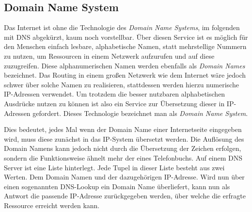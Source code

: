 \hypertarget{domain-name-system}{%
\subsection{Domain Name System}\label{domain-name-system}}

Das Internet ist ohne die Technologie des \emph{Domain Name Systems}, im
folgenden mit DNS abgekürzt, kaum noch vorstellbar. Über diesen Service
ist es möglich für den Menschen einfach lesbare, alphabetische Namen,
statt mehrstellige Nummern zu nutzen, um Ressourcen in einem Netzwerk
aufzurufen und auf diese zuzugreifen. Diese alphanumerischen Namen
werden ebenfalls als \emph{Domain Names} bezeichnet. Das Routing in
einem großen Netzwerk wie dem Internet wäre jedoch schwer über solche
Namen zu realisieren, stattdessen werden hierzu numerische IP-Adressen
verwendet. Um trotzdem die besser nutzbaren alphabetischen Ausdrücke
nutzen zu können ist also ein Service zur Übersetzung dieser in
IP-Adressen gefordert. Dieses Technologie bezeichnet man als
\emph{Domain Name System}.

Dies bedeutet, jedes Mal wenn der Domain Name einer Internetseite
eingegeben wird, muss diese zunächst in das IP-System übersetzt werden.
Die Auflösung des Domain Namens kann jedoch nicht durch die Übersetzung
der Zeichen erfolgen, sondern die Funktionsweise ähnelt mehr der eines
Telefonbuchs. Auf einem DNS Server ist eine Liste hinterlegt. Jede Tupel
in dieser Liste besteht aus zwei Werten. Dem Domain Namen und der
dazugehörigen IP-Adresse. Wird nun über einen sogenannten DNS-Lookup ein
Domain Name überliefert, kann nun als Antwort die passende IP-Adresse
zurückgegeben werden, über welche die erfragte Ressource erreicht werden
kann.
